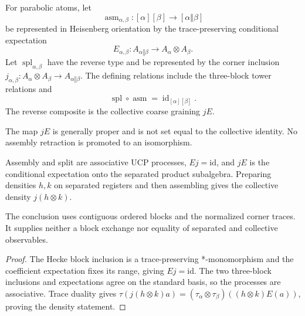 \begin{definition}
For parabolic atoms, let
\[
 \operatorname{asm}_{\alpha,\beta}:
 [\alpha][\beta]\longrightarrow[\alpha\mathbin\Vert\beta]
\]
be represented in Heisenberg orientation by the trace-preserving conditional
expectation
\[
 E_{\alpha,\beta}:A_{\alpha\mathbin\Vert\beta}
       \longrightarrow A_\alpha\otimes A_\beta.
\]
Let $\operatorname{spl}_{\alpha,\beta}$ have the reverse type and be
represented by the corner inclusion
$j_{\alpha,\beta}:A_\alpha\otimes A_\beta
\to A_{\alpha\mathbin\Vert\beta}$.  The defining relations include the
three-block tower relations and
\[
 \operatorname{spl}\circ\operatorname{asm}
    =\operatorname{id}_{[\alpha][\beta]}.
\]
The reverse composite is the collective coarse graining $jE$.
\end{definition}
\begin{scope}
The map $jE$ is generally proper and is not set equal to the collective
identity.  No assembly retraction is promoted to an isomorphism.
\end{scope}

\begin{theorem}
{\normalfont\statusProved}\quad
Assembly and split are associative UCP processes, $Ej=\mathrm{id}$, and
$jE$ is the conditional expectation onto the separated product subalgebra.
Preparing densities $h,k$ on separated registers and then assembling gives
the collective density $j(h\otimes k)$.
\end{theorem}
\begin{scope}
The conclusion uses contiguous ordered blocks and the normalized corner
traces.  It supplies neither a block exchange nor equality of separated and
collective observables.
\end{scope}
\begin{proof}
The Hecke block inclusion is a trace-preserving *-monomorphism and the
coefficient expectation fixes its range, giving $Ej=\mathrm{id}$.  The two
three-block inclusions and expectations agree on the standard basis, so the
processes are associative.  Trace duality gives
$\tau(j(h\otimes k)a)=(\tau_\alpha\otimes\tau_\beta)
((h\otimes k)E(a))$, proving the density statement.
\end{proof}

